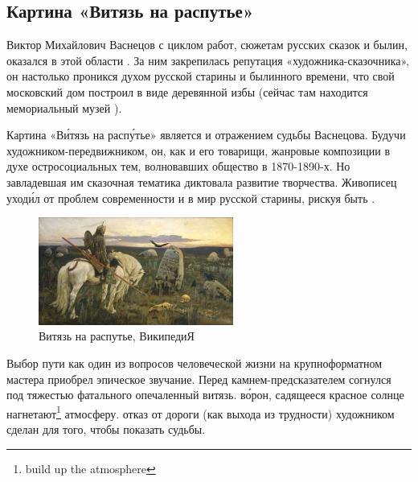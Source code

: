 \subsection{Картина «Витязь на распутье»}

Виктор Михайлович Васнецов с циклом работ,  сюжетам русских сказок и былин, оказался  в этой области . За ним закрепилась репутация «художника-сказочника», он настолько проникся духом русской старины и былинного времени, что свой московский дом построил в виде деревянной избы (сейчас там находится мемориальный музей ).


Картина «В\'{и}тязь на расп\'{у}тье»  является и отражением судьбы Васнецова.
Будучи  художником-передвижником, он, как и его товарищи,  жанровые композиции в духе остросоциальных тем, волновавших общество в 1870-1890-х.
Но завладевшая им сказочная тематика диктовала  развитие творчества. Живописец уход\'{и}л от проблем современности и  в мир русской старины, рискуя быть .

\begin{figure}
    \begin{center}
        \includegraphics[width=0.57\textwidth]{img/TheKnightAtTheCrossroads.jpg}
    \end{center}
    \caption{Витязь на распутье, ВикипедиЯ}
\end{figure}
Выбор пути как один из  вопросов человеческой жизни на крупноформатном  мастера приобрел эпическое звучание.
Перед камнем-предсказателем согнулся под тяжестью фатального  опечаленный витязь.  в\'{о}рон, садящееся красное солнце нагнетают\footnote{build up the atmosphere} атмосферу.  отказ от  дороги (как выхода из трудности) художником сделан для того, чтобы показать  судьбы.